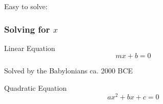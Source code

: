 \documentclass{beamer}
\begin{document}
\begin{frame}
Easy to solve:

\frametitle{Solving for $x$}
\begin{block}{Linear Equation}
\begin{equation}
    mx + b = 0
\end{equation}
\end{block}

Solved by the Babylonians ca. 2000 BCE

\begin{block}{Quadratic Equation}
\begin{equation}
    ax^2 + bx + c = 0
\end{equation}
\end{block}

\end{frame}

\end{document}

